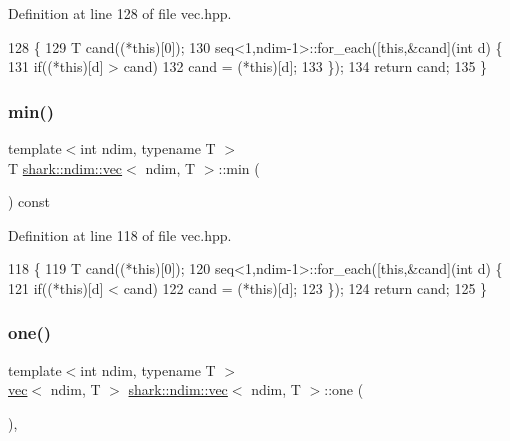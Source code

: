 Definition at line 128 of file vec.\+hpp.


\begin{DoxyCode}
128                                         \{
129             T cand((*\textcolor{keyword}{this})[0]);
130             seq<1,ndim-1>::for\_each([\textcolor{keyword}{this},&cand](\textcolor{keywordtype}{int} d) \{
131                 \textcolor{keywordflow}{if}((*\textcolor{keyword}{this})[d] > cand)
132                     cand = (*\textcolor{keyword}{this})[d];
133             \});
134             \textcolor{keywordflow}{return} cand;
135         \}
\end{DoxyCode}
\hypertarget{structshark_1_1ndim_1_1vec_a8db2f3a20f6cbf6cc2ebf9ecb00e0cc4}{}\label{structshark_1_1ndim_1_1vec_a8db2f3a20f6cbf6cc2ebf9ecb00e0cc4} 
\subsubsection{\texorpdfstring{min()}{min()}}
{\footnotesize\ttfamily template$<$int ndim, typename T $>$ \\
T \hyperlink{structshark_1_1ndim_1_1vec}{shark\+::ndim\+::vec}$<$ ndim, T $>$\+::min (\begin{DoxyParamCaption}{ }\end{DoxyParamCaption}) const\hspace{0.3cm}{\ttfamily [inline]}}



Definition at line 118 of file vec.\+hpp.


\begin{DoxyCode}
118                                         \{
119             T cand((*\textcolor{keyword}{this})[0]);
120             seq<1,ndim-1>::for\_each([\textcolor{keyword}{this},&cand](\textcolor{keywordtype}{int} d) \{
121                 \textcolor{keywordflow}{if}((*\textcolor{keyword}{this})[d] < cand)
122                     cand = (*\textcolor{keyword}{this})[d];
123             \});
124             \textcolor{keywordflow}{return} cand;
125         \}
\end{DoxyCode}
\hypertarget{structshark_1_1ndim_1_1vec_a96c9d1e9b072fbe2cb8ac4f229e25e85}{}\label{structshark_1_1ndim_1_1vec_a96c9d1e9b072fbe2cb8ac4f229e25e85} 
\subsubsection{\texorpdfstring{one()}{one()}}
{\footnotesize\ttfamily template$<$int ndim, typename T $>$ \\
\hyperlink{structshark_1_1ndim_1_1vec}{vec}$<$ ndim, T $>$ \hyperlink{structshark_1_1ndim_1_1vec}{shark\+::ndim\+::vec}$<$ ndim, T $>$\+::one (\begin{DoxyParamCaption}{ }\end{DoxyParamCaption})\hspace{0.3cm}{\ttfamily [inline]}, {\ttfamily [static]}}




